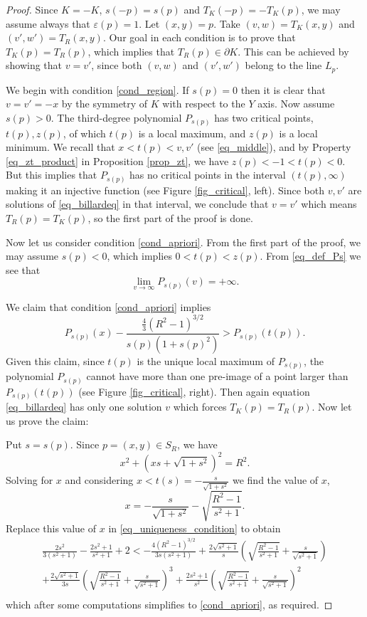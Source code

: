 \documentclass[10pt,a4paper]{amsart}
\def \e{\varepsilon}
\begin{document}
\begin{proof}
	Since $K = -K$, $s(-p) = s(p)$ and $T_K(-p) = - T_K(p)$, we may assume always that $\e(p) = 1$.
	Let $(x,y) = p$.
	Take $(v,w) = T_K(x,y)$ and $(v',w') = T_R(x,y)$.
	Our goal in each condition is to prove that $T_K(p) = T_R(p)$, which implies that $T_R(p) \in \partial K$.
	This can be achieved by showing that $v = v'$, since both $(v,w)$ and $(v',w')$ belong to the line $L_p$.

	We begin with condition \eqref{cond_region}.
	If $s(p) = 0$ then it is clear that $v = v' = -x$ by the symmetry of $K$ with respect to the $Y$ axis.
	Now assume $s(p) > 0$.
	The third-degree polynomial $P_{s(p)}$ has two critical points, $t(p), z(p)$, of which $t(p)$ is a local maximum, and $z(p)$ is a local minimum.
	We recall that $x < t(p) < v,v'$ (see \eqref{eq_middle}), and by Property \eqref{eq_zt_product} in Proposition \ref{prop_zt}, we have $z(p) < -1 < t(p) <  0$.
	But this implies that $P_{s(p)}$ has no critical points in the interval $(t(p), \infty)$ making it an injective function (see Figure \ref{fig_critical}, left).
	Since both $v,v'$ are solutions of \eqref{eq_billardeq} in that interval, we conclude that $v=v'$ which means $T_R(p) = T_K(p)$, so the first part of the proof is done.

	Now let us consider condition \eqref{cond_apriori}.
	From the first part of the proof, we may assume $s(p) < 0$, which implies $0 < t(p) < z(p)$. From \eqref{eq_def_Ps} we see that
	\[\lim_{v \to \infty} P_{s(p)} (v) = +\infty.\]

	We claim that condition \eqref{cond_apriori} implies 
	\begin{equation}
		\label{eq_uniqueness_condition}
		P_{s(p)} (x) - \frac{\frac 43 (R^2-1)^{3/2}}{s(p)(1+s(p)^2)} > P_{s(p)} (t(p)).
	\end{equation}
	Given this claim, since $t(p)$ is the unique local maximum of $P_{s(p)} $, the polynomial $P_{s(p)} $ cannot have more than one pre-image of a point larger than $P_{s(p)} (t(p))$ (see Figure \ref{fig_critical}, right).
	Then again equation \eqref{eq_billardeq} has only one solution $v$ which forces $T_K(p) = T_R(p)$.
	Now let us prove the claim:

	Put $s = s(p)$. Since $p = (x,y) \in S_R$, we have
	\[
		x^2 + (x s + \sqrt{1+s^2})^2 = R^2.
	\]
	Solving for $x$ and considering $x < t(s) = - \frac s {\sqrt{1+s^2}}$ we find the value of $x$,
	\[
		x = - \frac s {\sqrt{1+s^2}} - \sqrt{\frac{R^2-1}{s^2+1}}.
	\]
	Replace this value of $x$ in \eqref{eq_uniqueness_condition} to obtain
	\begin{align}
		\frac{2 s^2}{3 (s^2+1)}-\frac{2 s^2+1}{s^2+1}+2 <
		-\frac{4 (R^2-1)^{3/2}}{3 s (s^2+1)}
		+\frac{2 \sqrt{s^2+1} }{s} \left(\sqrt{\frac{R^2-1}{s^2+1}} +\frac{s}{\sqrt{s^2+1}}\right) \\
		+\frac{2 \sqrt{s^2+1}}{3 s} \left(\sqrt{\frac{R^2-1}{s^2+1}}+\frac{s}{\sqrt{s^2+1}}\right)^3
		+\frac{2 s^2+1}{s^2} \left(\sqrt{\frac{R^2-1}{s^2+1}}+\frac{s}{\sqrt{s^2+1}}\right)^2 \\
	\end{align}
	which after some computations simplifies to \eqref{cond_apriori}, as required.
	

\end{proof}
\end{document}
